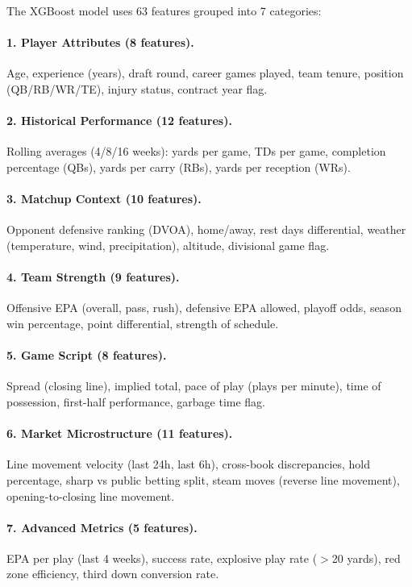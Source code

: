 The XGBoost model uses 63 features grouped into 7 categories:

\paragraph{1. Player Attributes (8 features).}
Age, experience (years), draft round, career games played, team tenure, position (QB/RB/WR/TE), injury status, contract year flag.

\paragraph{2. Historical Performance (12 features).}
Rolling averages (4/8/16 weeks): yards per game, TDs per game, completion percentage (QBs), yards per carry (RBs), yards per reception (WRs).

\paragraph{3. Matchup Context (10 features).}
Opponent defensive ranking (DVOA), home/away, rest days differential, weather (temperature, wind, precipitation), altitude, divisional game flag.

\paragraph{4. Team Strength (9 features).}
Offensive EPA (overall, pass, rush), defensive EPA allowed, playoff odds, season win percentage, point differential, strength of schedule.

\paragraph{5. Game Script (8 features).}
Spread (closing line), implied total, pace of play (plays per minute), time of possession, first-half performance, garbage time flag.

\paragraph{6. Market Microstructure (11 features).}
Line movement velocity (last 24h, last 6h), cross-book discrepancies, hold percentage, sharp vs public betting split, steam moves (reverse line movement), opening-to-closing line movement.

\paragraph{7. Advanced Metrics (5 features).}
EPA per play (last 4 weeks), success rate, explosive play rate ($>$20 yards), red zone efficiency, third down conversion rate.

